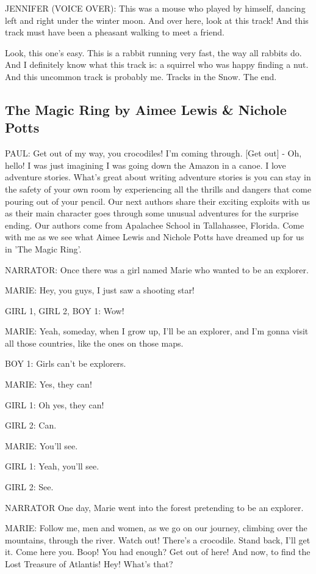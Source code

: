 JENNIFER (VOICE OVER):
This was a mouse who played by himself, dancing left and right under the winter moon.
And over here, look at this track!
And this track must have been a pheasant walking to meet a friend.

Look, this one's easy.
This is a rabbit running very fast, the way all rabbits do.
And I definitely know what this track is: a squirrel who was happy finding a nut.
And this uncommon track is probably me.
Tracks in the Snow.
The end.

\subsection{The Magic Ring by Aimee Lewis \& Nichole Potts}

PAUL:
Get out of my way, you crocodiles!
I'm coming through.
    [Get out] -
Oh, hello!
I was just imagining I was going down the Amazon in a canoe.
I love adventure stories.
What's great about writing adventure stories is you can stay in the safety of your own room by experiencing all the thrills and dangers that come pouring out of your pencil.
Our next authors share their exciting exploits with us as their main character goes through some unusual adventures for the surprise ending.
Our authors come from Apalachee School in Tallahassee, Florida.
Come with me as we see what Aimee Lewis and Nichole Potts have dreamed up for us in 'The Magic Ring'.

NARRATOR:
Once there was a girl named Marie who wanted to be an explorer.

MARIE:
Hey, you guys, I just saw a shooting star!

GIRL 1, GIRL 2, BOY 1:
Wow!

MARIE:
Yeah, someday, when I grow up, I'll be an explorer, and I'm gonna visit all those countries, like the ones on those maps.

BOY 1:
Girls can't be explorers.

MARIE:
Yes, they can!

GIRL 1:
Oh yes, they can!

GIRL 2:
Can.

MARIE:
You'll see.

GIRL 1:
Yeah, you'll see.

GIRL 2:
See.

NARRATOR
One day, Marie went into the forest pretending to be an explorer.

MARIE:
Follow me, men and women, as we go on our journey, climbing over the mountains, through the river.
Watch out!
There's a crocodile.
Stand back, I'll get it.
Come here you.
Boop!
You had enough?
Get out of here!
And now, to find the Lost Treasure of Atlantis!
Hey!
What's that?


